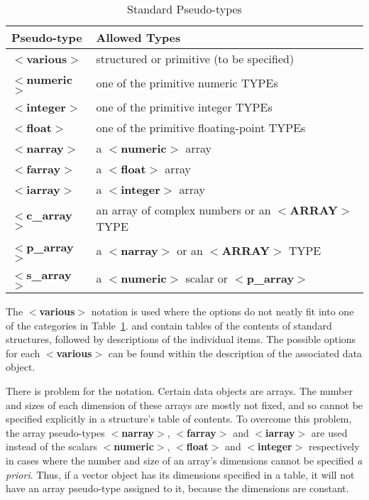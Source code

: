 \begin{table}[htb]
\centering
\caption{Standard Pseudo-types}
\label{ta:pseudotypes}
\begin{tabular}[t]{|l|l|}
\hline
Pseudo-type & Allowed Types \\ \hline
$<${\bf various}$>$  & structured or primitive (to be specified) \\
$<${\bf numeric}$>$  & one of the primitive numeric TYPEs \\
$<${\bf integer}$>$  & one of the primitive integer TYPEs \\
$<${\bf float}$>$    & one of the primitive floating-point TYPEs \\
$<${\bf narray}$>$   & a $<${\bf numeric}$>$ array \\
$<${\bf farray}$>$   & a $<${\bf float}$>$ array \\
$<${\bf iarray}$>$   & a $<${\bf integer}$>$ array \\
$<${\bf c\_array}$>$ & an array of complex numbers or an $<${\bf ARRAY}$>$ TYPE \\
$<${\bf p\_array}$>$ & a $<${\bf narray}$>$ or an $<${\bf ARRAY}$>$ TYPE \\
$<${\bf s\_array}$>$ & a $<${\bf numeric}$>$ scalar or $<${\bf p\_array}$>$ \\ \hline
\end{tabular}
\end{table}

The $<${\bf various}$>$ notation is used where the options do not neatly 
fit into one of the categories in Table~\ref{ta:pseudotypes}.
 and 
contain tables of the contents of standard structures, followed by
descriptions of the individual items. The possible options for each
$<${\bf various}$>$ can be found within the description of the
associated data object.

There is problem for the notation.
Certain data objects are arrays. The number and sizes of each dimension
of these arrays are mostly not fixed, and so cannot be specified explicitly
in a structure's table of contents.
To overcome this problem, the array pseudo-types
$<${\bf narray}$>$, $<${\bf farray}$>$
and $<${\bf iarray}$>$ are used instead of the scalars
$<${\bf numeric}$>$, $<${\bf float}$>$ and $<${\bf integer}$>$ respectively
in cases where the number and size of an array's dimensions cannot be
specified {\it a priori}.
Thus, if a vector object has its dimensions specified in a table,
it will not have an array pseudo-type assigned to it, because the 
dimensions are constant.

